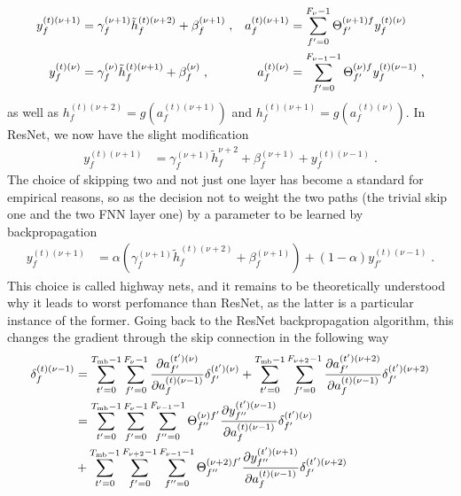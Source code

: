 \begin{subappendices}
\begin{align}
y_{f}^{(t)(\nu+1)}&=\gamma_f^{(\nu+1)}\tilde{h}_f^{(t)(\nu+2)}+\beta_f^{(\nu+1)}\;,&
%
a_{f}^{(t)(\nu+1)}&=\sum^{F_{\nu}-1}_{f'=0}\Theta^{(\nu+1)f}_{f'}y_{f}^{(t)(\nu)}\notag\\
%
y_{f}^{(t)(\nu)}&=\gamma_f^{(\nu)}\tilde{h}_f^{(t)(\nu+1)}+\beta_f^{(\nu)}\;,&
%
a_{f}^{(t)(\nu)}&=\sum^{F_{\nu-1}-1}_{f'=0}\Theta^{(\nu)f}_{f'}y_{f}^{(t)(\nu-1)}\;,
\end{align}
as well as $h^{(t)(\nu+2)}_f=g\left(a_{f}^{(t)(\nu+1)}\right)$ and $h^{(t)(\nu+1)}_f=g\left(a_{f}^{(t)(\nu)}\right)$. In ResNet, we now have the slight modification
\begin{align}
y_{f}^{(t)(\nu+1)}&=\gamma_f^{(\nu+1)}\tilde{h}_f^{\nu+2}+\beta_f^{(\nu+1)}+y^{(t)(\nu-1)}_{f}\;.
\end{align}
The choice of skipping two and not just one layer has become a standard for empirical reasons, so as the decision not to weight the two paths (the trivial skip one and the two FNN layer one) by a parameter to be learned by backpropagation 
\begin{align}
y_{f}^{(t)(\nu+1)}&=\alpha\left(\gamma_f^{(\nu+1)}\tilde{h}_f^{(t)(\nu+2)}+\beta_f^{(\nu+1)}\right)
%
+\left( 1-\alpha\right)y^{(t)(\nu-1)}_{f'}\;.
\end{align}
This choice is called highway nets\cite{citeulike:14070430}, and it remains to be theoretically understood why it leads to worst perfomance than ResNet, as the latter is a particular instance of the former. Going back to the ResNet backpropagation algorithm, this changes the gradient through the skip connection in the following way
\begin{align}
\delta^{(t)(\nu-1)}_f&=
%
\sum_{t'=0}^{T_{{\rm mb}}-1}\sum_{f'=0}^{F_{\nu}-1}
%
 \frac{\partial  a_{f'}^{(t')(\nu)}}{\partial  a_{f}^{(t)(\nu-1)}} \delta^{(t')(\nu)}_{f'}
+\sum_{t'=0}^{T_{{\rm mb}}-1}\sum_{f'=0}^{F_{\nu+2}-1}
%
 \frac{\partial  a_{f'}^{(t')(\nu+2)}}{\partial  a_{f}^{(t)(\nu-1)}} \delta^{(t')(\nu+2)}_{f'}\notag\\
%
&=\sum_{t'=0}^{T_{{\rm mb}}-1}\sum_{f'=0}^{F_{\nu}-1}\sum^{F_{\nu-1}-1}_{f''=0}\Theta^{(\nu)f'}_{f''}
%
\frac{\partial y^{(t')(\nu-1)}_{f''} }{\partial  a_{f}^{(t)(\nu-1)}} \delta^{(t')(\nu)}_{f'}\notag\\
%
&+\sum_{t'=0}^{T_{{\rm mb}}-1}\sum_{f'=0}^{F_{\nu+2}-1}\sum^{F_{\nu-1}-1}_{f''=0}\Theta^{(\nu+2)f'}_{f''}
%
\frac{\partial y^{(t')(\nu+1)}_{f''} }{\partial  a_{f}^{(t)(\nu-1)}} \delta^{(t')(\nu+2)}_{f'}\notag\\

\end{align}
\end{subappendices}
